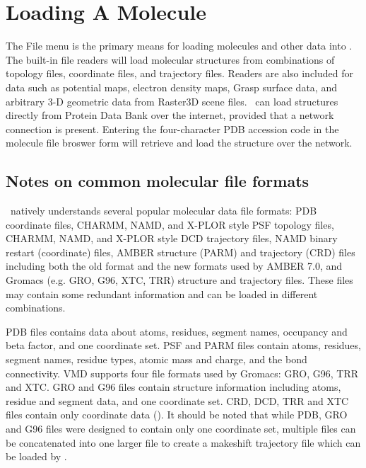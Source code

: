 %
%
%

\chapter{Loading A Molecule}
\label{ug:topic:filetypes}

The File menu is the primary means for loading molecules and other
data into \VMD.  The built-in file readers will load molecular structures 
from combinations of topology files, coordinate files, and trajectory files.  
Readers are also included for data such as potential maps, 
electron density maps, Grasp surface data, and arbitrary 3-D geometric 
data from Raster3D scene files.  
\VMD\ can load structures directly from Protein Data Bank
over the internet, provided that a network connection is present.  
Entering the four-character PDB accession code in the molecule file
broswer form will retrieve and load the structure over the network.

\section{Notes on common molecular file formats}
\VMD\ natively understands several popular molecular data file formats: 
PDB coordinate files, 
CHARMM, NAMD, and X-PLOR style PSF topology files, 
CHARMM, NAMD, and X-PLOR style DCD trajectory files, 
NAMD binary restart (coordinate) files,
AMBER structure (PARM) and trajectory (CRD) files  including
both the old format and the new formats used by AMBER 7.0, 
and Gromacs (e.g. GRO, G96, XTC, TRR) structure and trajectory files.  
These files may contain some redundant information and can be loaded 
in different combinations.

PDB files contains data about atoms, residues, segment names,
occupancy and beta factor, and one coordinate set.  
PSF and PARM files contain atoms, residues, segment names, residue
types, atomic mass and charge, and the bond connectivity.  
VMD supports four file formats used by Gromacs: GRO, G96, TRR and XTC.  
GRO and G96 files contain structure information including atoms, 
residue and segment data, and one coordinate set.  
CRD, DCD, TRR and XTC files contain only coordinate data (\timesteps).  
It should be noted that while PDB, GRO and G96 files were designed
to contain only one coordinate set, multiple files can be 
concatenated into one larger file to create a makeshift trajectory file
which can be loaded by \VMD.

